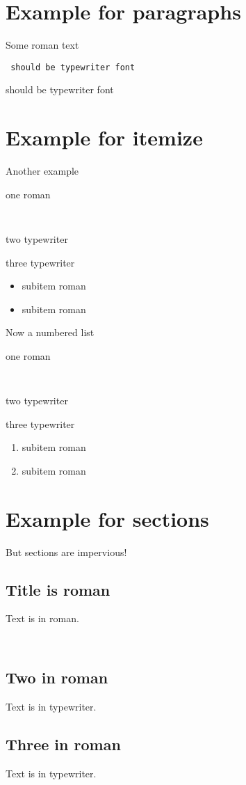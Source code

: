\documentclass[11pt]{article}
\begin{document}
\section{Example for paragraphs}

Some roman text

{\tt
should be typewriter font

should be typewriter font
}

\section{Example for itemize}

Another example

\begin{itemize}
\item one roman
{\tt
\item two typewriter
\item three typewriter
}
\begin{itemize}
\item subitem roman
\item subitem roman
\end{itemize}
\end{itemize}

Now a numbered list

\begin{enumerate}
\item one roman
{\tt
\item two typewriter
\item three typewriter
}
\begin{enumerate}
\item subitem roman
\item subitem roman
\end{enumerate}
\end{enumerate}

\section{Example for sections}
But sections are impervious!

\subsection{Title is roman}
Text is in roman.

{\tt
\subsection{Two in roman}
Text is in typewriter.

\subsection{Three in roman}
Text is in typewriter.
}
\end{document}

